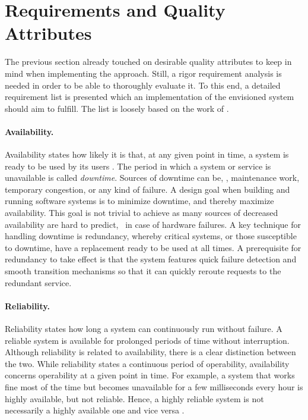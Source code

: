 %
%
%
%
%
%
%
%
%
%

\section{Requirements and Quality Attributes} \label{sec:requirements}
The previous section already touched on desirable quality attributes to keep in mind when implementing the approach. Still, a rigor requirement analysis is needed in order to be able to thoroughly evaluate it. To this end, a detailed requirement list is presented which an implementation of the envisioned system should aim to fulfill. The list is loosely based on the work of \citeauthor*{o2007quality} \cite{o2007quality}.


\paragraph{Availability.}
Availability states how likely it is that, at any given point in time, a system is ready to be used by its users \cite{tanenbaum2017distributed}. The period in which a system or service is unavailable is called \emph{downtime}. Sources of downtime can be, \eg , maintenance work, temporary congestion, or any kind of failure. A design goal when building and running software systems is to minimize downtime, and thereby maximize availability. This goal is not trivial to achieve as many sources of decreased availability are hard to predict, \eg\ in case of hardware failures. A key technique for handling downtime is redundancy, whereby critical systems, or those susceptible to downtime, have a replacement ready to be used at all times. A prerequisite for redundancy to take effect is that the system features quick failure detection and smooth transition mechanisms so that it can quickly reroute requests to the redundant service.

\paragraph{Reliability.}
Reliability states how long a system can continuously run without failure. A reliable system is available for prolonged periods of time without interruption. Although reliability is related to availability, there is a clear distinction between the two. While reliability states a continuous period of operability, availability concerns operability at a given point in time. For example, a system that works fine most of the time but becomes unavailable for a few milliseconds every hour is highly available, but not reliable. Hence, a highly reliable system is not necessarily a highly available one and vice versa \cite{tanenbaum2017distributed}.

